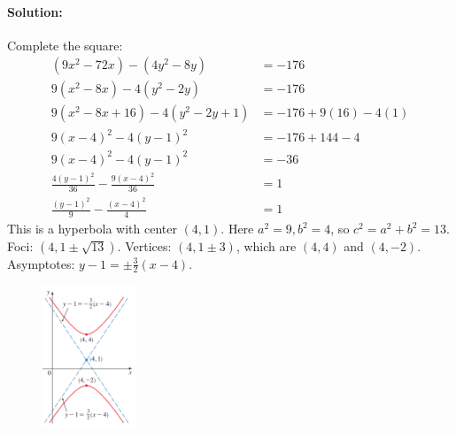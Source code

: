 \documentclass{article}
\begin{document}
\paragraph{Solution:}
Complete the square:
\begin{align*}
    (9x^2 - 72x) - (4y^2 - 8y) &= -176 \\
    9(x^2 - 8x) - 4(y^2 - 2y) &= -176 \\
    9(x^2 - 8x + 16) - 4(y^2 - 2y + 1) &= -176 + 9(16) - 4(1) \\
    9(x-4)^2 - 4(y-1)^2 &= -176 + 144 - 4 \\
    9(x-4)^2 - 4(y-1)^2 &= -36 \\
    \frac{4(y-1)^2}{36} - \frac{9(x-4)^2}{36} &= 1 \\
    \frac{(y-1)^2}{9} - \frac{(x-4)^2}{4} &= 1
\end{align*}
This is a hyperbola with center $(4,1)$. Here $a^2=9, b^2=4$, so $c^2 = a^2+b^2=13$.
Foci: $(4, 1 \pm \sqrt{13})$. Vertices: $(4, 1 \pm 3)$, which are $(4,4)$ and $(4,-2)$.
Asymptotes: $y-1 = \pm\frac{3}{2}(x-4)$.
\begin{figure}[htbp]
    \centering
    \includegraphics[width=0.25\textwidth]{graph59.png}
\end{figure}
\end{document}
